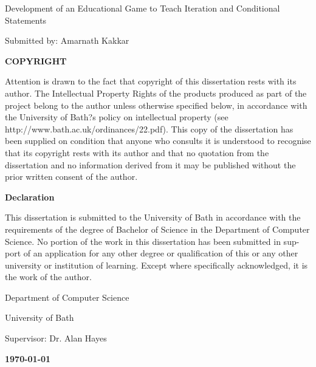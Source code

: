 \documentclass[a4paper,11.5pt]{report}
\numberwithin{figure}{section}
\numberwithin{table}{section}
\numberwithin{equation}{section}
\numberwithin{equation}{section}
\begin{document}
\newpage



    
\clearpage\thispagestyle{empty}
\begin{center}
\begin{minipage}{1\linewidth}
    \vspace{2cm}
    {\LARGE Development of an Educational Game to Teach Iteration and Conditional Statements \par}
    \vspace{1cm}	
    {\large Submitted by: Amarnath Kakkar\par}
	
    \vspace{1.5cm}
    {\Large \textbf{COPYRIGHT}\par}
    \vspace{0.5cm}
    {Attention is drawn to the fact that copyright of this dissertation rests with its author. The Intellectual Property Rights of the products produced as part of the project belong to the author unless otherwise specified below, in accordance with the University of Bath?s policy on intellectual property
(see http://www.bath.ac.uk/ordinances/22.pdf).
This copy of the dissertation has been supplied on condition that anyone who consults it is understood to recognise that its copyright rests with its author and that no quotation from the dissertation and no information derived from it may be published without the prior written consent of the author.\par}

     \vspace{0.5cm}
     {\Large \textbf{Declaration}\par}
      \vspace{0.5cm}
      {This dissertation is submitted to the University of Bath in accordance with the requirements of the degree of Bachelor of Science in the Department of Computer Science. No portion of the work in this dissertation has been submitted in sup- port of an application for any other degree or qualification of this or any other university or institution of learning. Except where specifically acknowledged, it is the work of the author.\par}
    
     \vspace{2.5cm}
    {\large Department of Computer Science\par}
    {\large University of Bath\par}
    \vspace{0.5cm}
    {\large Supervisor: Dr. Alan Hayes}\par
    {\large \textbf{\monthyeardate\today}\par}
    \vspace{1cm}
\end{minipage}
\end{center}
\end{document}
